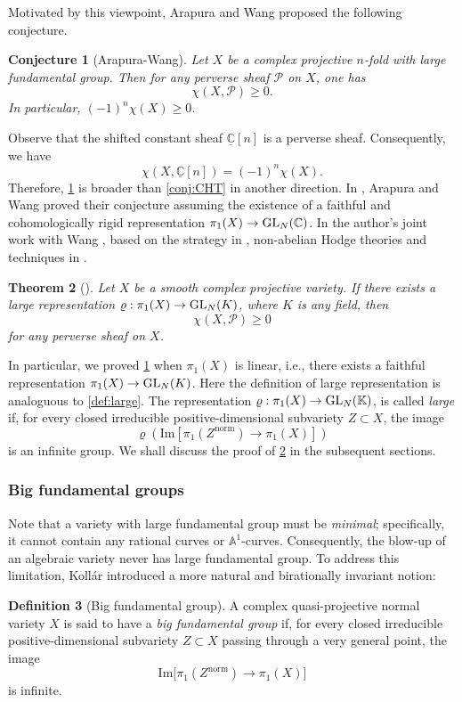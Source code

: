 \documentclass[english]{amsproc}
\theoremstyle{plain}
\newtheorem{thm}{Theorem}[section]
\newtheorem{conjecture}[thm]{Conjecture}
\theoremstyle{definition}
\newtheorem{dfn}[thm]{Definition}
\theoremstyle{remark}
\theoremstyle{plain}
\numberwithin{equation}{thm} %
\newcommand{\cP}{\mathcal P}
\newcommand{\GL}{{\rm GL}}
\begin{document}
	
	Motivated by this viewpoint, Arapura and Wang 
	\cite[Conjecture~1.2]{AW25} proposed the following conjecture.
	\begin{conjecture}[Arapura-Wang]\label{conj:AW}
		Let $X$ be a   complex projective $n$-fold with large fundamental group. 
		Then for any perverse sheaf $\cP$ on $X$, one has
		\[
		\chi(X,\cP)\geq 0. 
		\] In particular, $(-1)^n\chi(X)\geq 0$. 
	\end{conjecture}
	Observe that the shifted constant sheaf $\underline{\mathbb{C}}[n]$ is a perverse sheaf. Consequently, we have
	$$
	\chi(X, \underline{\mathbb{C}}[n]) = (-1)^n \chi(X).
	$$Therefore, \cref{conj:AW} is broader than \cref{conj:CHT} in another direction. In \cite{AW25}, Arapura and Wang proved their conjecture assuming the existence of a faithful and cohomologically rigid representation $\pi_1(X)\to \GL_N(\mathbb{C})$. In the author's joint work with Wang \cite{DW24}, based on the strategy in \cite{AW25}, non-abelian Hodge theories and techniques in \cite{Eys04,EKPR12,DY23}. 
	\begin{thm}[\cite{DW24}]\label{thm:CHT}
		Let $X$ be a smooth complex projective variety. If there exists a  large representation  $\varrho:\pi_1(X)\to \GL_N(K)$, where $K$ is any field,  then
		$$
		\chi(X,\cP)\geq 0
		$$
		for any perverse sheaf on $X$. 
	\end{thm}
	In particular, we proved \cref{conj:AW} when $\pi_1(X)$ is {linear}, i.e., there exists a faithful representation $\pi_1(X)\to \GL_{N}(K)$. Here the definition of  {large representation} is analoguous to \cref{def:large}. The representation $\varrho:\pi_1(X)\to \GL_N(\mathbb{K})$, is called \emph{large} if, for every closed irreducible positive-dimensional subvariety $Z \subset X$, the image
	$$
	\varrho(\mathrm{Im} [\pi_1(Z^{\mathrm{norm}}) \longrightarrow \pi_1(X)])
	$$
	is an {infinite group}.
	We shall discuss the proof of \cref{thm:CHT} in the subsequent sections. 
	\subsubsection{Big fundamental groups}
	Note that a variety with  large fundamental group must be \emph{minimal}; specifically, it cannot contain any rational curves or $\mathbb{A}^1$-curves. Consequently, the blow-up of an algebraic variety never has large fundamental group. To address this limitation, Koll\'ar introduced a more natural and birationally invariant notion:
	
	\begin{dfn}[Big fundamental group]\label{def:big}
		A complex quasi-projective normal variety $X$ is said to have a \emph{big fundamental group} if, for every closed irreducible positive-dimensional subvariety $Z \subset X$ passing through a very general point, the image
		\[
		\mathrm{Im}\bigl[\pi_1(Z^{\mathrm{norm}}) \longrightarrow \pi_1(X)\bigr]
		\]
		is infinite.
	\end{dfn}
	
\end{document}
